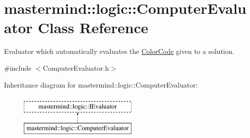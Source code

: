 \hypertarget{classmastermind_1_1logic_1_1_computer_evaluator}{}\section{mastermind\+:\+:logic\+:\+:Computer\+Evaluator Class Reference}
\label{classmastermind_1_1logic_1_1_computer_evaluator}


Evaluator which automatically evaluates the \hyperlink{classmastermind_1_1logic_1_1_color_code}{Color\+Code} given to a solution.  




{\ttfamily \#include $<$Computer\+Evaluator.\+h$>$}

Inheritance diagram for mastermind\+:\+:logic\+:\+:Computer\+Evaluator\+:\begin{figure}[H]
\begin{center}
\leavevmode
\includegraphics[height=2.000000cm]{classmastermind_1_1logic_1_1_computer_evaluator}
\end{center}
\end{figure}
